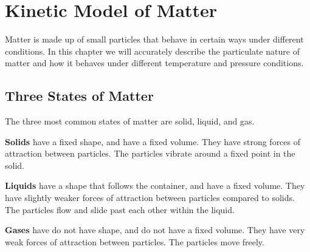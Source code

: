 \documentclass[../main.tex]{subfiles}
\begin{document}
	\section{Kinetic Model of Matter}
	
	\begin{preamb}
		Matter is made up of small particles that behave in certain ways under different conditions. In this chapter we will accurately describe the particulate nature of matter and how it behaves under different temperature and pressure conditions.
	\end{preamb}
	
	\subsection{Three States of Matter}
	The three most common states of matter are solid, liquid, and gas. 
	
	\textbf{Solids} have a fixed shape, and have a fixed volume. They have strong forces of attraction between particles. The particles vibrate around a fixed point in the solid.
	
	\textbf{Liquids} have a shape that follows the container, and have a fixed volume. They have slightly weaker forces of attraction between particles compared to solids. The particles flow and slide past each other within the liquid.
	
	\textbf{Gases} have do not have shape, and do not have a fixed volume. They have very weak forces of attraction between particles. The particles move freely.
	
	
\end{document}
